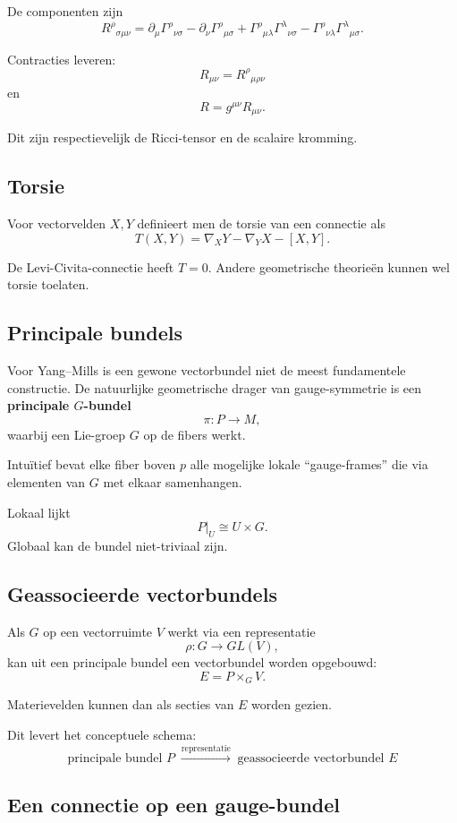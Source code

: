 \documentclass[11pt,a4paper]{article}
\begin{document}
De componenten zijn
\[
R^\rho{}_{\sigma\mu\nu}
=\partial_\mu\Gamma^\rho{}_{\nu\sigma}
-\partial_\nu\Gamma^\rho{}_{\mu\sigma}
+\Gamma^\rho{}_{\mu\lambda}\Gamma^\lambda{}_{\nu\sigma}
-\Gamma^\rho{}_{\nu\lambda}\Gamma^\lambda{}_{\mu\sigma}.
\]

Contracties leveren:
\[
R_{\mu\nu}=R^\rho{}_{\mu\rho\nu}
\]
en
\[
R=g^{\mu\nu}R_{\mu\nu}.
\]

Dit zijn respectievelijk de Ricci-tensor en de scalaire kromming.

\subsection{Torsie}

Voor vectorvelden $X,Y$ definieert men de torsie van een connectie als
\[
T(X,Y)=\nabla_XY-\nabla_YX-[X,Y].
\]

De Levi-Civita-connectie heeft $T=0$. Andere geometrische theorieën kunnen wel torsie toelaten.

\subsection{Principale bundels}

Voor Yang--Mills is een gewone vectorbundel niet de meest fundamentele constructie. De natuurlijke geometrische drager van gauge-symmetrie is een \textbf{principale $G$-bundel}
\[
\pi:P\to M,
\]
waarbij een Lie-groep $G$ op de fibers werkt.

Intuïtief bevat elke fiber boven $p$ alle mogelijke lokale ``gauge-frames'' die via elementen van $G$ met elkaar samenhangen.

Lokaal lijkt
\[
P|_U\cong U\times G.
\]
Globaal kan de bundel niet-triviaal zijn.

\subsection{Geassocieerde vectorbundels}

Als $G$ op een vectorruimte $V$ werkt via een representatie
\[
\rho:G\to GL(V),
\]
kan uit een principale bundel een vectorbundel worden opgebouwd:
\[
E=P\times_G V.
\]

Materievelden kunnen dan als secties van $E$ worden gezien.

Dit levert het conceptuele schema:
\[
\boxed{
\text{principale bundel }P
\;\xrightarrow{\text{representatie}}\;
\text{geassocieerde vectorbundel }E
}
\]

\subsection{Een connectie op een gauge-bundel}
\end{document}
